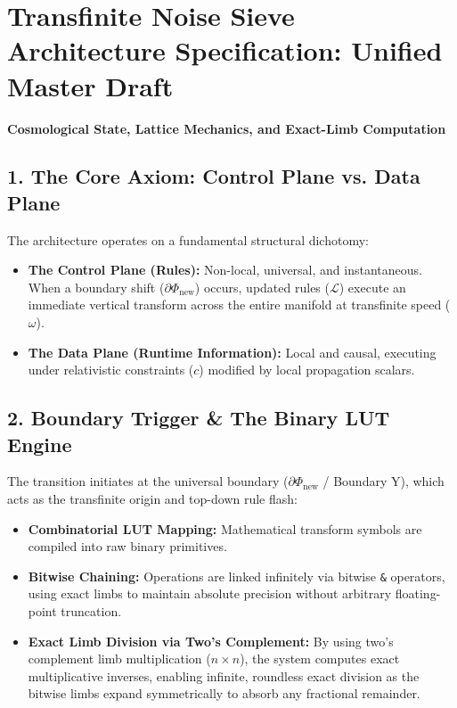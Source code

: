 \chapter{\texorpdfstring{Transfinite Noise Sieve Architecture Specification: Unified Master Draft}{Transfinite Noise Sieve Architecture Specification: Unified Master Draft}}
\label{chap:noise-sieve-3-tower-scheduling-floor-minus-4}

\textbf{Cosmological State, Lattice Mechanics, and Exact-Limb Computation}

\medskip

\section{\texorpdfstring{1. The Core Axiom: Control Plane vs. Data Plane}{1. The Core Axiom: Control Plane vs. Data Plane}}

The architecture operates on a fundamental structural dichotomy:

\begin{itemize}
\item \textbf{The Control Plane (Rules):} Non-local, universal, and instantaneous. When a boundary shift (\(\partial\Phi_{\text{new}}\)) occurs, updated rules (\(\mathcal{L}\)) execute an immediate vertical transform across the entire manifold at transfinite speed (\(\omega\)).
\item \textbf{The Data Plane (Runtime Information):} Local and causal, executing under relativistic constraints (\(c\)) modified by local propagation scalars.
\end{itemize}

\medskip

\section{\texorpdfstring{2. Boundary Trigger \& The Binary LUT Engine}{2. Boundary Trigger \& The Binary LUT Engine}}

The transition initiates at the universal boundary (\(\partial\Phi_{\text{new}}\) / Boundary Y), which acts as the transfinite origin and top-down rule flash:

\begin{itemize}
\item \textbf{Combinatorial LUT Mapping:} Mathematical transform symbols are compiled into raw binary primitives.
\item \textbf{Bitwise Chaining:} Operations are linked infinitely via bitwise \texttt{\&} operators, using exact limbs to maintain absolute precision without arbitrary floating-point truncation.
\item \textbf{Exact Limb Division via Two's Complement:} By using two's complement limb multiplication (\(n \times n\)), the system computes exact multiplicative inverses, enabling infinite, roundless exact division as the bitwise limbs expand symmetrically to absorb any fractional remainder.
\end{itemize}

